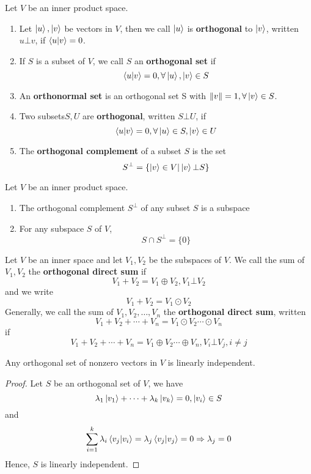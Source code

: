 \documentclass{article}
\begin{document}
\begin{dde}
	Let $V$ be an inner product space.\\
	\begin{enumerate}
		\item Let $\ket{u},\ket{v}$ be vectors in $V$, then we call $\ket{u}$ is \textbf{orthogonal} to $\ket{v}$, written $u\bot v$, if $\braket{u|v}=0$.
		\item If $S$ is a subset of $V$, we call $S$ an \textbf{orthogonal set} if
		 \[\braket{u|v}=0,\forall \ket{u},\ket{v}\in S\]
		\item An \textbf{orthonormal set} is an orthogonal set S with $\Vert v\Vert=1,\forall \ket{v}\in S$.
		\item Two subsets$S,U$ are \textbf{orthogonal}, written $S\bot U$, if 
		\[\braket{u|v}=0,\forall \ket{u}\in S,\ket{v}\in U\]
		\item The \textbf{orthogonal complement} of a subset $S$ is the set
		\[S^\bot=\{\ket{v}\in V|\ket{v}\bot S\}\] 
	\end{enumerate}
\end{dde}
\begin{thm}
	Let $V$ be an inner product space.
	\begin{enumerate}
		\item The orthogonal complement $S^\bot$ of any subset $S$ is a subspace
		\item For any subspace $S$ of $V$,
		\[S\cap S^\bot=\{0\}\] 
	\end{enumerate}
\end{thm}
\begin{dde}
	Let $V$ be an inner space and let $V_1,V_2$ be the subspaces of $V$. We call the sum of $V_1,V_2$ the \textbf{orthogonal direct sum} if 
	\[V_1+V_2=V_1\oplus V_2,V_1\bot V_2\]
	and we write
	\[V_1+V_2=V_1\odot V_2\]
	Generally, we call the sum of $V_1,V_2,\dots,V_n$ the \textbf{orthogonal direct sum}, written
	\[V_1+V_2+\cdots+V_n=V_1\odot V_2\cdots\odot V_n\]
	if 
	\[V_1+V_2+\cdots+V_n=V_1\oplus V_2\cdots\oplus V_n,V_i\bot V_j,i\neq j\]
\end{dde}
\begin{thm}
	Any orthogonal set of nonzero vectors in $V$ is linearly independent.
\end{thm}
\begin{proof}
	Let $S$ be an orthogonal set of $V$, we have
	\[\lambda_1\ket{v_1}+\cdots+\lambda_k\ket{v_k}=0,\ket{v_i}\in S\]
	and
	\[\sum_{i=1}^k\lambda_i\braket{v_j|v_i}=\lambda_j\braket{v_j|v_j}=0\Rightarrow\lambda_j=0\]
	Hence, $S$ is linearly independent.
\end{proof}
\end{document}
